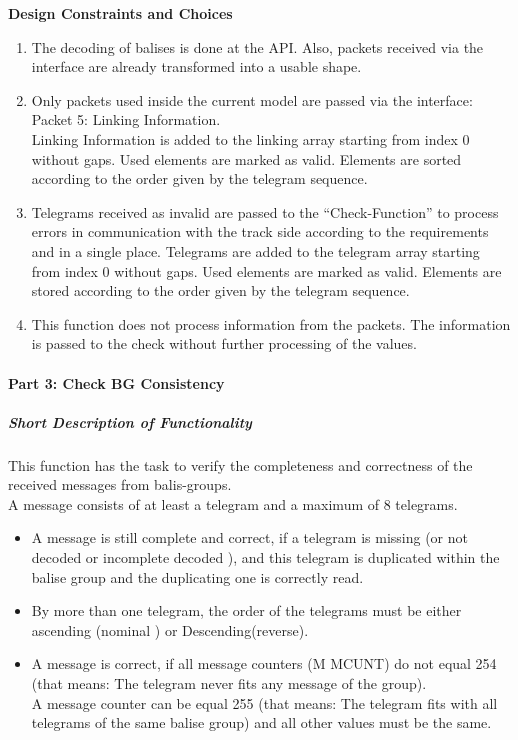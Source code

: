 \documentclass{template/openetcs_report}
\begin{document}
\textbf{Design Constraints and Choices}
\begin{enumerate}
\item The decoding of balises is done at the API. Also, packets received via the interface are already transformed into a usable shape.
\item Only packets used inside the current model are passed via the interface:\\
Packet 5: Linking Information.\\
Linking Information is added to the linking array starting from index 0 without gaps. Used elements are marked as valid. Elements are sorted according to the order given by the telegram sequence.
\item Telegrams received as invalid are passed to the ``Check-Function'' to process errors in communication with the track side according to the requirements and in a single place.
Telegrams are added to the telegram array starting from index 0 without gaps. Used elements are marked as valid. Elements are stored according to the order given by the telegram sequence.
\item This function does not process information from the packets. The information is passed to the check without further processing of the values. 
\end{enumerate}

\paragraph{Part 3: Check BG Consistency}

\subparagraph{Short Description of Functionality}
This function has the task  to verify the completeness and correctness of the received messages from balis-groups.\\
A message consists of at least a telegram and a maximum of 8 telegrams.\\

\begin{itemize}
\item A message is still complete and correct, if a telegram is missing (or not decoded or incomplete decoded ), and this telegram is duplicated within the balise group and the duplicating one is correctly read.
\item By more than one telegram, the order of the telegrams must be either ascending (nominal ) or Descending(reverse).\\
\item A message is correct, if  all message counters (M MCUNT) do not equal 254 (that means: The telegram never fits any message of the group).\\ A message counter can be equal 255 (that means: The telegram fits with all telegrams of the same balise group) and all other values must be the same.\\
\end{itemize}
\end{document}
